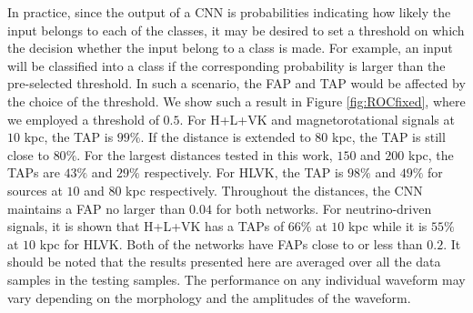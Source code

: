 \documentclass[aps,twocolumn,showpacs,groupedaddress, nofootinbib]{revtex4}  %
\begin{document}
In practice, since the output of a \ac{CNN} is probabilities indicating how likely the input belongs to each of the classes, 
it may be desired to set a threshold on which the decision whether the input belong to a class is made.
For example, an input will be classified into a class if the corresponding probability is larger than the pre-selected threshold.
In such a scenario, the \ac{FAP} and \ac{TAP} would be affected by the choice of the threshold.
We show such a result in Figure \ref{fig:ROCfixed}, where we employed a threshold of $0.5$. 
For H+L+VK and magnetorotational signals at $10$ kpc, the \ac{TAP} is $99\%$. 
If the distance is extended to $80$ kpc, the \ac{TAP} is still close to $80\%$.
For the largest distances tested in this work, $150$ and $200$ kpc, the \acp{TAP} are $43\%$ and $29\%$ respectively.
For HLVK, the \ac{TAP} is $98\%$ and $49\%$ for sources at $10$ and $80$ kpc respectively.
Throughout the distances, the \ac{CNN} maintains a \ac{FAP} no larger than $0.04$ for both networks.
For neutrino-driven signals, it is shown that H+L+VK has a \acp{TAP} of $66\%$ at $10$ kpc while it is $55\%$ at $10$ kpc for HLVK.
Both of the networks have \acp{FAP} close to or less than $0.2$.
It should be noted that the results presented here are averaged over all the data samples in the testing samples.
The performance on any individual waveform may vary depending on the morphology and the amplitudes of the waveform.

\end{document}
